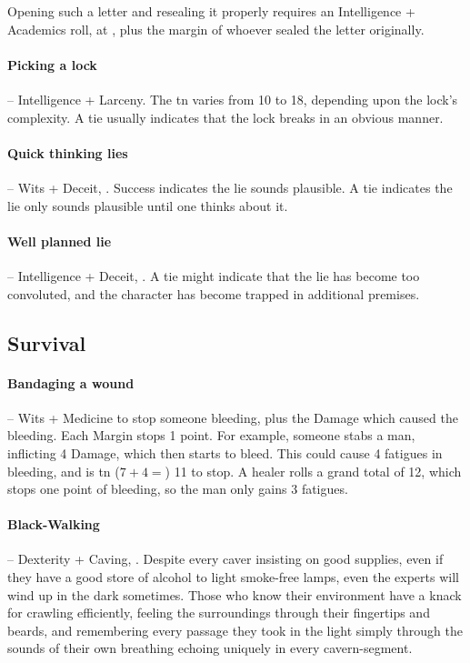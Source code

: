\begin{multicols}{2}
Opening such a letter and resealing it properly requires an Intelligence + Academics roll, at , plus the margin of whoever sealed the letter originally.

\paragraph{Picking a lock} -- Intelligence + Larceny.
The \gls{tn} varies from 10 to 18, depending upon the lock's complexity.
A tie usually indicates that the lock breaks in an obvious manner.

\paragraph{Quick thinking lies} -- Wits + Deceit, .
Success indicates the lie sounds plausible.
A tie indicates the lie only sounds plausible until one thinks about it.

\paragraph{Well planned lie} -- Intelligence + Deceit, .
A tie might indicate that the lie has become too convoluted, and the character has become trapped in additional premises.

\subsection{Survival}

\paragraph{Bandaging a wound} -- Wits + Medicine to stop someone bleeding,  plus the Damage which caused the bleeding.
Each Margin stops 1 point.
For example, someone stabs a man, inflicting 4 Damage, which then starts to bleed.
This could cause 4 \glspl{fatigue} in bleeding, and is \gls{tn} ($7 + 4 = $) 11 to stop.
A healer rolls a grand total of 12, which stops one point of bleeding, so the man only gains 3 \glspl{fatigue}.

\paragraph{Black-Walking} -- Dexterity + Caving, .
Despite every caver insisting on good supplies, even if they have a good store of alcohol to light smoke-free lamps, even the experts will wind up in the dark sometimes.
Those who know their environment have a knack for crawling efficiently, feeling the surroundings through their fingertips and beards, and remembering every passage they took in the light simply through the sounds of their own breathing echoing uniquely in every cavern-segment.


\end{multicols}
